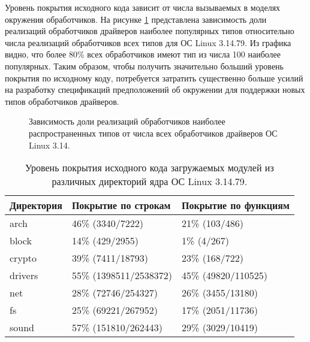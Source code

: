 Уровень покрытия исходного кода зависит от числа вызываемых в моделях окружения обработчиков.
На рисунке \ref{figure:handlers} представлена зависимость доли реализаций обработчиков драйверов наиболее популярных типов относительно числа реализаций обработчиков всех типов для ОС Linux 3.14.79. Из графика видно, что более 80\% всех обработчиков имеют тип из числа 100 наиболее популярных.
Таким образом, чтобы получить значительно больший уровень покрытия по исходному коду, потребуется затратить существенно больше усилий на разработку спецификаций предположений об окружении для поддержки новых типов обработчиков драйверов.

\begin{figure}
\centering
{}
\caption{Зависимость доли реализаций обработчиков наиболее распространенных типов от числа всех обработчиков драйверов ОС Linux 3.14.}
\label{figure:handlers}
\end{figure}

\begin{table}
\centering
\begin{tabular}{ | l | l | l |}
\hline
Директория & Покрытие по строкам & Покрытие по функциям\\
\hline
arch & 46\% (3340/7222) & 21\% (103/486)\\
\hline
block & 14\% (429/2955) & 1\% (4/267)\\
\hline
crypto & 39\% (7411/18793) & 23\% (168/722)\\
\hline
drivers & 55\% (1398511/2538372) &  45\% (49820/110525) \\
\hline
net & 28\% (72746/254327) & 26\% (3455/13180) \\  	
\hline
fs & 25\% (69221/267952) & 17\% (2051/11736) \\ 	
\hline
sound & 57\% (151810/262443)  & 29\% (3029/10419) \\ 
\hline
\end{tabular}
\caption{Уровень покрытия исходного кода загружаемых модулей из различных директорий ядра ОС Linux 3.14.79.}
\label{table:coverage}
\end{table}

